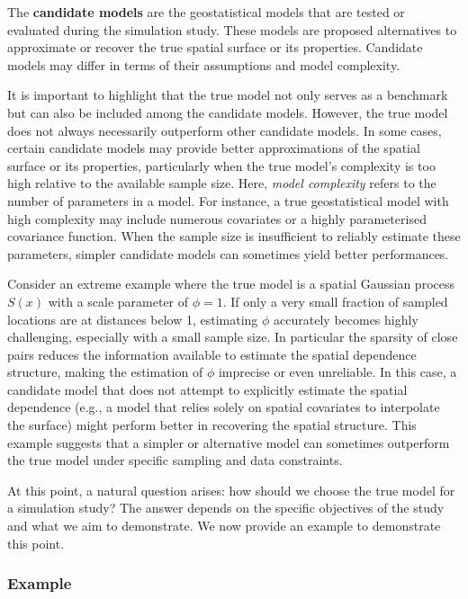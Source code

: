 \documentclass[
  letterpaper,
]{krantz}
\begin{document}
The \textbf{candidate models} are the geostatistical models that are
tested or evaluated during the simulation study. These models are
proposed alternatives to approximate or recover the true spatial surface
or its properties. Candidate models may differ in terms of their
assumptions and model complexity.

It is important to highlight that the true model not only serves as a
benchmark but can also be included among the candidate models. However,
the true model does not always necessarily outperform other candidate
models. In some cases, certain candidate models may provide better
approximations of the spatial surface or its properties, particularly
when the true model's complexity is too high relative to the available
sample size. Here, \emph{model complexity} refers to the number of
parameters in a model. For instance, a true geostatistical model with
high complexity may include numerous covariates or a highly
parameterised covariance function. When the sample size is insufficient
to reliably estimate these parameters, simpler candidate models can
sometimes yield better performances.

Consider an extreme example where the true model is a spatial Gaussian
process \(S(x)\) with a scale parameter of \(\phi = 1\). If only a very
small fraction of sampled locations are at distances below 1, estimating
\(\phi\) accurately becomes highly challenging, especially with a small
sample size. In particular the sparsity of close pairs reduces the
information available to estimate the spatial dependence structure,
making the estimation of \(\phi\) imprecise or even unreliable. In this
case, a candidate model that does not attempt to explicitly estimate the
spatial dependence (e.g., a model that relies solely on spatial
covariates to interpolate the surface) might perform better in
recovering the spatial structure. This example suggests that a simpler
or alternative model can sometimes outperform the true model under
specific sampling and data constraints.

At this point, a natural question arises: how should we choose the true
model for a simulation study? The answer depends on the specific
objectives of the study and what we aim to demonstrate. We now provide
an example to demonstrate this point.

\subsubsection{Example}\label{example}
\end{document}

